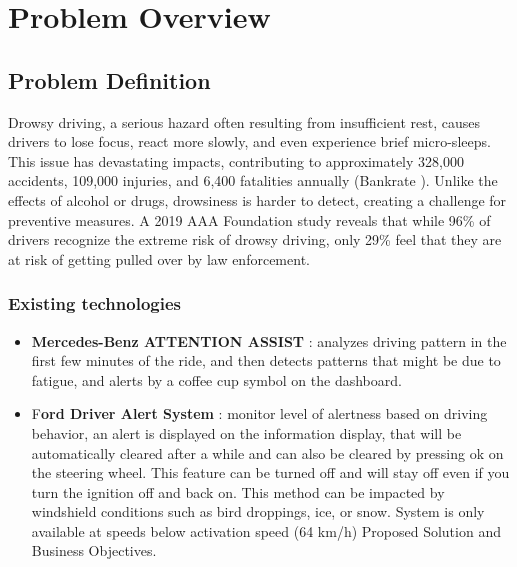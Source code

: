 \documentclass{modeleRapport}
\begin{document}
\fairepagedegarde
\fairetabledesmatieres


\section{Problem Overview}

\subsection{Problem Definition}

Drowsy driving, a serious hazard often resulting from insufficient rest, causes drivers to lose focus, react more slowly, and even experience brief micro-sleeps. This issue has devastating impacts, contributing to approximately 328,000 accidents, 109,000 injuries, and 6,400 fatalities annually (Bankrate \cite{Bankrate}). Unlike the effects of alcohol or drugs, drowsiness is harder to detect, creating a challenge for preventive measures. A 2019 AAA Foundation \cite{AAAFoundation} study reveals that while 96\% of drivers recognize the extreme risk of drowsy driving, only 29\% feel that they are at risk of getting pulled over by law enforcement. 


\subsubsection{Existing technologies}

\begin{itemize}
\item \textbf{Mercedes-Benz ATTENTION ASSIST} \cite{Mercedes}: analyzes driving pattern in the first few minutes of the ride, and then detects patterns that might be due to fatigue, and alerts by a coffee cup symbol on the dashboard.  

\item F\textbf{ord Driver Alert System} \cite{Ford}: monitor level of alertness based on driving behavior, an alert is displayed on the information display, that will be automatically cleared after a while and can also be cleared by pressing ok on the steering wheel. This feature can be turned off and will stay off even if you turn the ignition off and back on. This method can be impacted by windshield conditions such as bird droppings, ice, or snow. System is only available at speeds below activation speed (64 km/h) Proposed Solution and Business Objectives. 
\end{itemize}
\end{document}
